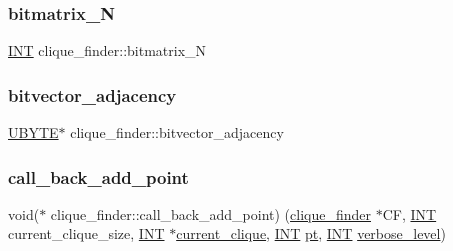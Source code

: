 \mbox{\label{classclique__finder_a33b18bebf9e2f0457e4257ea51e4902a}} 
\subsubsection{\texorpdfstring{bitmatrix\+\_\+N}{bitmatrix\_N}}
{\footnotesize\ttfamily \mbox{\hyperlink{galois_8h_a09fddde158a3a20bd2dcadb609de11dc}{I\+NT}} clique\+\_\+finder\+::bitmatrix\+\_\+N}

\mbox{\label{classclique__finder_aa8b15a08017503ba397cc059584e3d6f}} 
\subsubsection{\texorpdfstring{bitvector\+\_\+adjacency}{bitvector\_adjacency}}
{\footnotesize\ttfamily \mbox{\hyperlink{galois_8h_a122c4acf389c050379f00341fdcd5812}{U\+B\+Y\+TE}}$\ast$ clique\+\_\+finder\+::bitvector\+\_\+adjacency}

\mbox{\label{classclique__finder_ad9a6cc663ef506e169e35b86919d682b}} 
\subsubsection{\texorpdfstring{call\+\_\+back\+\_\+add\+\_\+point}{call\_back\_add\_point}}
{\footnotesize\ttfamily void($\ast$ clique\+\_\+finder\+::call\+\_\+back\+\_\+add\+\_\+point) (\mbox{\hyperlink{classclique__finder}{clique\+\_\+finder}} $\ast$CF, \mbox{\hyperlink{galois_8h_a09fddde158a3a20bd2dcadb609de11dc}{I\+NT}} current\+\_\+clique\+\_\+size, \mbox{\hyperlink{galois_8h_a09fddde158a3a20bd2dcadb609de11dc}{I\+NT}} $\ast$\mbox{\hyperlink{classclique__finder_a220d65214d4e619b47eef475cc6499ad}{current\+\_\+clique}}, \mbox{\hyperlink{galois_8h_a09fddde158a3a20bd2dcadb609de11dc}{I\+NT}} \mbox{\hyperlink{clique__finder_8_c_aec1f1a2b30fdca8844c2932384483145}{pt}}, \mbox{\hyperlink{galois_8h_a09fddde158a3a20bd2dcadb609de11dc}{I\+NT}} \mbox{\hyperlink{classclique__finder_a0039c6c78005df91c2f78efdc1c8156f}{verbose\+\_\+level}})}


